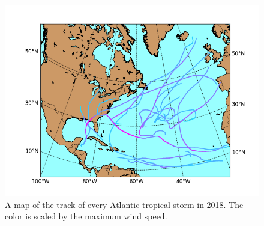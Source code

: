 \begin{figure}
	\centering
	\includegraphics[width=\linewidth]{images/2018_max_winds.png}
	\caption{A map of the track of every Atlantic tropical storm in 2018. The color is scaled by the maximum wind speed.}
	\label{fig:2018_storm_tracks}
\end{figure}